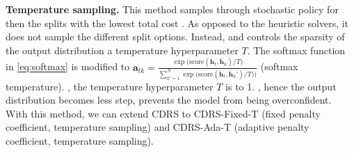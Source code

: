 \textbf{Temperature sampling.} This method samples through stochastic policy for  then  the splits with the lowest total cost  \cite{neural_bello,vnf_drl_solozabal}. As opposed to the heuristic solvers, it does not sample the different split options. Instead,  and controls the sparsity of the output distribution  a temperature hyperparameter $T$. The softmax function in \eqref{eq:softmax} is modified to $\bm{a}_{tk} = \frac{\exp\big( \text{score}(\bm{h}_t,\bm{\bar{h}}_k)/T \big)}{\sum_{k'=1}^{N} \exp\big(\text{score}(\bm{h}_t,\bm{\bar{h}}_k')/T ) \big)}$ (softmax temperature). , the temperature hyperparameter $T$ is  to 1. , hence the output distribution becomes less step,  prevents the model from being overconfident. With this method, we can extend CDRS to CDRS-Fixed-T (fixed penalty coefficient, temperature sampling) and CDRS-Ada-T (adaptive penalty coefficient, temperature sampling). 









